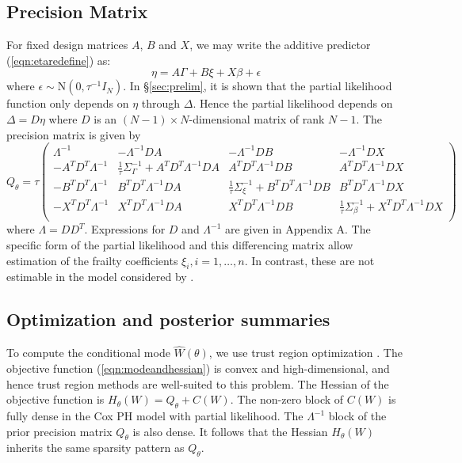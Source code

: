 \documentclass[]{article}
\begin{document}
\subsection{Precision Matrix}\label{subsec:Q} 

For fixed design matrices $A$, $B$ and $X$, we may write the additive predictor (\ref{eqn:etaredefine}) as:
\begin{equation}
\eta = A\Gamma + B\xi + X\beta + \epsilon
\end{equation}
where $\epsilon \sim \text{N}\left( 0,\tau^{-1}I_{N}\right)$.
In \S\ref{sec:prelim}, it is shown that the partial likelihood function only depends on $\eta$ through $\Delta$. Hence the partial likelihood depends on $\Delta = D\eta$ where $D$ is an $(N -1) \times N $-dimensional matrix of rank $N -1$. The precision matrix is given by
\begin{equation}\label{eqn:precmat}
Q_{\theta} = \tau\begin{pmatrix}
\Lambda^{-1} & -\Lambda^{-1}DA & -\Lambda^{-1}DB & - \Lambda^{-1}DX \\
- A^{T}D^{T}\Lambda^{-1} & \frac{1}{\tau}\Sigma_{\Gamma}^{-1} +  A^{T}D^{T}\Lambda^{-1}DA &  A^{T}D^{T}\Lambda^{-1}DB &  A^{T}D^{T}\Lambda^{-1}DX \\
- B^{T}D^{T}\Lambda^{-1} &  B^{T}D^{T}\Lambda^{-1}DA & \frac{1}{\tau}\Sigma_{\xi}^{-1} +  B^{T}D^{T}\Lambda^{-1}DB & B^{T}D^{T}\Lambda^{-1}DX \\
- X^{T}D^{T}\Lambda^{-1} &  X^{T}D^{T}\Lambda^{-1}DA & X^{T}D^{T}\Lambda^{-1}DB & \frac{1}{\tau}\Sigma_{\beta}^{-1} +  X^{T}D^{T}\Lambda^{-1}DX \\
\end{pmatrix}
\end{equation}
where $\Lambda = DD^{T}$. Expressions for $D$ and $\Lambda^{-1}$ are given in Appendix A. The specific form of the partial likelihood and this differencing matrix allow estimation of the frailty coefficients $\xi_{i},i = 1,\ldots,n$. In contrast, these are not estimable in the model considered by \citet{casecross}.

\subsection{Optimization and posterior summaries}\label{subsec:opt}

To compute the conditional mode $\hat{W}(\theta)$, we use trust region optimization \citep{trustoptim}. The objective function (\ref{eqn:modeandhessian}) is convex and high-dimensional, and hence trust region methods are well-suited to this problem. The Hessian of the objective function is $H_{\theta}(W) = Q_{\theta} + C(W)$. The non-zero block of $C(W)$ is fully dense in the Cox PH model with partial likelihood. The $\Lambda^{-1}$ block of the prior precision matrix $Q_{\theta}$ is also dense. It follows that the Hessian $H_{\theta}(W)$ inherits the same sparsity pattern as $Q_{\theta}$.
\end{document}
